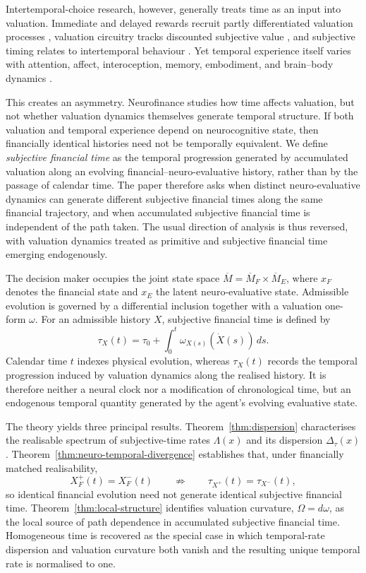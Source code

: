\documentclass[graybox,natbib]{SNmult}
\providecommand{\1}{}
\renewcommand{\1}{\mathbbm 1}
\begin{document}
Intertemporal-choice research, however, generally treats time as an input into
valuation. Immediate and delayed rewards recruit partly differentiated
valuation processes \citep{McClureLaibsonLoewensteinCohen2004}, valuation
circuitry tracks discounted subjective value \citep{KableGlimcher2007}, and
subjective timing relates to intertemporal behaviour
\citep{WittmannPaulus2008}. Yet temporal experience itself varies with
attention, affect, interoception, memory, embodiment, and brain--body dynamics
\citep{BuhusiMeck2005,WittmannVanWassenhove2009,Wittmann2013,
TsaoYousefzadehMeckMoserMoser2022,Buzsaki2026}.

This creates an asymmetry. Neurofinance studies how time affects valuation,
but not whether valuation dynamics themselves generate temporal structure.
If both valuation and temporal experience depend on neurocognitive state, then
financially identical histories need not be temporally equivalent. We define
\emph{subjective financial time} as the temporal progression generated by
accumulated valuation along an evolving financial--neuro-evaluative history,
rather than by the passage of calendar time. The paper therefore asks when
distinct neuro-evaluative dynamics can generate different subjective financial
times along the same financial trajectory, and when accumulated subjective
financial time is independent of the path taken. The usual direction of analysis is thus reversed, with valuation dynamics
treated as primitive and subjective financial time emerging endogenously.

The decision maker occupies the joint state space
\(\overline M=\overline M_F\times\overline M_E\), where \(x_F\) denotes the
financial state and \(x_E\) the latent neuro-evaluative state. Admissible
evolution is governed by a differential inclusion together with a valuation
one-form \(\omega\). For an admissible history \(X\), subjective financial time
is defined by
\[
\tau_X(t)
=
\tau_0+
\int_0^t
\omega_{X(s)}\!\left(\dot X(s)\right)\,ds.
\]
Calendar time \(t\) indexes physical evolution, whereas \(\tau_X(t)\) records
the temporal progression induced by valuation dynamics along the realised
history. It is therefore neither a neural clock nor a modification of
chronological time, but an endogenous temporal quantity generated by the
agent's evolving evaluative state.

The theory yields three principal results. Theorem~\ref{thm:dispersion}
characterises the realisable spectrum of subjective-time rates
\(\Lambda(x)\) and its dispersion \(\Delta_\tau(x)\).
Theorem~\ref{thm:neuro-temporal-divergence} establishes that, under financially
matched realisability,
\[
X_F^+(t)=X_F^-(t)
\qquad\not\Rightarrow\qquad
\tau_{X^+}(t)=\tau_{X^-}(t),
\]
so identical financial evolution need not generate identical subjective
financial time. Theorem~\ref{thm:local-structure} identifies valuation
curvature, \(\Omega=d\omega\), as the local source of path dependence in
accumulated subjective financial time. Homogeneous time is recovered as the
special case in which temporal-rate dispersion and valuation curvature both
vanish and the resulting unique temporal rate is normalised to one.
\end{document}
